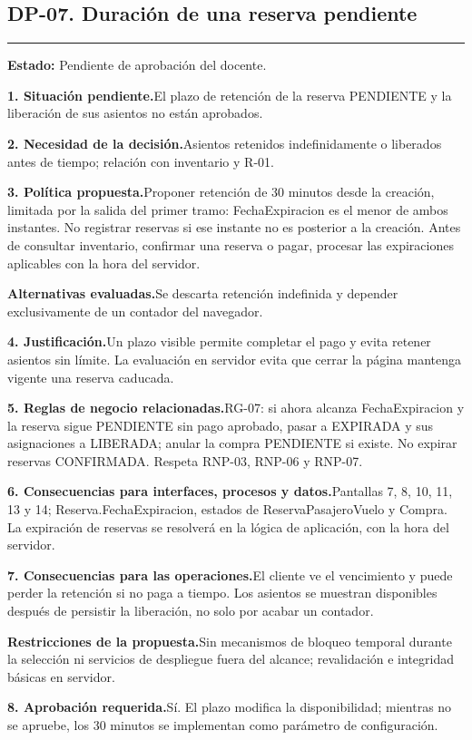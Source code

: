 \documentclass[11pt,a4paper]{article}
\newcommand{\fichacampo}[2]{\noindent\textbf{\color{azulvip}#1}\enspace #2\par\vspace{3pt}}
\begin{document}
\subsection{DP-07. Duración de una reserva pendiente}
{\color{doradovip}\rule{\textwidth}{.5pt}}
\textbf{Estado:} Pendiente de aprobación del docente.\par\vspace{4pt}
{\normalsize
\fichacampo{1. Situación pendiente.}{El plazo de retención de la reserva PENDIENTE y la liberación de sus asientos no están aprobados.}
\fichacampo{2. Necesidad de la decisión.}{Asientos retenidos indefinidamente o liberados antes de tiempo; relación con inventario y R-01.}
\fichacampo{3. Política propuesta.}{Proponer retención de 30 minutos desde la creación, limitada por la salida del primer tramo: FechaExpiracion es el menor de ambos instantes. No registrar reservas si ese instante no es posterior a la creación. Antes de consultar inventario, confirmar una reserva o pagar, procesar las expiraciones aplicables con la hora del servidor.}
\fichacampo{Alternativas evaluadas.}{Se descarta retención indefinida y depender exclusivamente de un contador del navegador.}
\fichacampo{4. Justificación.}{Un plazo visible permite completar el pago y evita retener asientos sin límite. La evaluación en servidor evita que cerrar la página mantenga vigente una reserva caducada.}
\fichacampo{5. Reglas de negocio relacionadas.}{RG-07: si ahora alcanza FechaExpiracion y la reserva sigue PENDIENTE sin pago aprobado, pasar a EXPIRADA y sus asignaciones a LIBERADA; anular la compra PENDIENTE si existe. No expirar reservas CONFIRMADA. Respeta RNP-03, RNP-06 y RNP-07.}
\fichacampo{6. Consecuencias para interfaces, procesos y datos.}{Pantallas 7, 8, 10, 11, 13 y 14; Reserva.FechaExpiracion, estados de ReservaPasajeroVuelo y Compra. La expiración de reservas se resolverá en la lógica de aplicación, con la hora del servidor.}
\fichacampo{7. Consecuencias para las operaciones.}{El cliente ve el vencimiento y puede perder la retención si no paga a tiempo. Los asientos se muestran disponibles después de persistir la liberación, no solo por acabar un contador.}
\fichacampo{Restricciones de la propuesta.}{Sin mecanismos de bloqueo temporal durante la selección ni servicios de despliegue fuera del alcance; revalidación e integridad básicas en servidor.}
\fichacampo{8. Aprobación requerida.}{Sí. El plazo modifica la disponibilidad; mientras no se apruebe, los 30 minutos se implementan como parámetro de configuración.}
}
\clearpage
\end{document}
